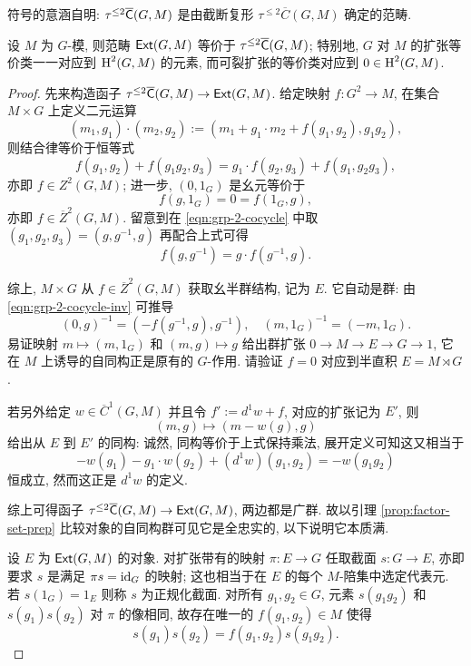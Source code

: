 符号的意涵自明: $\tau^{\leq 2}\overline{\mathsf{C}}(G, M)$ 是由截断复形 $\tau^{\leq 2}\overline{C}(G, M)$ 确定的范畴.

\begin{theorem}\label{prop:factor-set}
	设 $M$ 为 $G$-模, 则范畴 $\mathsf{Ext}(G, M)$ 等价于 $\tau^{\leq 2}\overline{\mathsf{C}}(G, M)$; 特别地, $G$ 对 $M$ 的扩张等价类一一对应到 $\operatorname{H}^2(G, M)$ 的元素, 而可裂扩张的等价类对应到 $0 \in \operatorname{H}^2(G, M)$.
\end{theorem}
\begin{proof}
	先来构造函子 $\tau^{\leq 2}\overline{\mathsf{C}}(G, M) \to \mathsf{Ext}(G, M)$. 给定映射 $f: G^2 \to M$, 在集合 $M \times G$ 上定义二元运算
	\[ (m_1, g_1) \cdot (m_2, g_2) := \left( m_1 + g_1 \cdot m_2 + f(g_1, g_2)  , g_1 g_2 \right), \]
	则结合律等价于恒等式
	\begin{equation}\label{eqn:grp-2-cocycle}
		f(g_1, g_2) + f(g_1 g_2, g_3) = g_1 \cdot f(g_2, g_3) + f(g_1, g_2 g_3),
	\end{equation}
	亦即 $f \in Z^2(G, M)$; 进一步, $(0, 1_G)$ 是幺元等价于
	\[ f(g, 1_G) = 0 = f(1_G, g), \]
	亦即 $f \in \overline{Z}^2(G, M)$. 留意到在 \eqref{eqn:grp-2-cocycle} 中取 $(g_1, g_2, g_3) = (g, g^{-1}, g)$ 再配合上式可得
	\begin{equation}\label{eqn:grp-2-cocycle-inv}
		f(g, g^{-1}) = g \cdot f(g^{-1}, g).
	\end{equation}
	
	综上, $M \times G$ 从 $f \in \overline{Z}^2(G, M)$ 获取幺半群结构, 记为 $E$. 它自动是群: 由 \eqref{eqn:grp-2-cocycle-inv} 可推导
	\[ (0, g)^{-1} = \left( -f(g^{-1}, g), g^{-1} \right), \quad (m, 1_G)^{-1} = \left(-m, 1_G\right). \]
	易证映射 $m \mapsto (m, 1_G)$ 和 $(m, g) \mapsto g$ 给出群扩张 $0 \to M \to E \to G \to 1$, 它在 $M$ 上诱导的自同构正是原有的 $G$-作用. 请验证 $f = 0$ 对应到半直积 $E = M \rtimes G$.
	
	若另外给定 $w \in \overline{C}^1(G, M)$ 并且令 $f' := d^1 w + f$, 对应的扩张记为 $E'$, 则
	\[ (m, g) \mapsto (m - w(g) , g) \]
	给出从 $E$ 到 $E'$ 的同构: 诚然, 同构等价于上式保持乘法, 展开定义可知这又相当于
	\[ - w(g_1) - g_1 \cdot w(g_2) + (d^1 w)(g_1, g_2) = - w(g_1 g_2) \]
	恒成立, 然而这正是 $d^1 w$ 的定义.
	
	综上可得函子 $\tau^{\leq 2} \overline{\mathsf{C}}(G, M) \to \mathsf{Ext}(G, M)$, 两边都是广群. 故以引理 \ref{prop:factor-set-prep} 比较对象的自同构群可见它是全忠实的, 以下说明它本质满.
	
	设 $E$ 为 $\mathsf{Ext}(G, M)$ 的对象. 对扩张带有的映射 $\pi: E \to G$ 任取截面 $s: G \to E$, 亦即要求 $s$ 是满足 $\pi s = \mathrm{id}_G$ 的映射; 这也相当于在 $E$ 的每个 $M$-陪集中选定代表元. 若 $s(1_G) = 1_E$ 则称 $s$ 为正规化截面. 对所有 $g_1, g_2 \in G$, 元素 $s(g_1 g_2)$ 和 $s(g_1) s(g_2)$ 对 $\pi$ 的像相同, 故存在唯一的 $f(g_1, g_2) \in M$ 使得
	\[ s(g_1) s(g_2) = f(g_1, g_2) s(g_1 g_2). \]
	

\end{proof}
